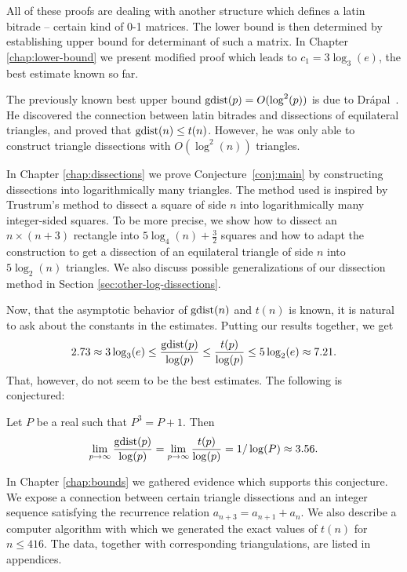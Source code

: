 All of these proofs are dealing with another structure which defines a latin bitrade -- certain kind of 0-1 matrices. The lower bound is then determined by establishing upper bound for determinant of such a matrix. In Chapter \ref{chap:lower-bound} we present modified proof which leads to $c_1 = 3 \log_3(e)$, the best estimate known so far.

\bigskip

The previously known best upper bound $\mathop{\mathrm{gdist}}(p) = O(\log^2(p))$ is due to Drápal~\cite{Drapal91}. He discovered the connection between latin bitrades and dissections of equilateral triangles, and proved that $\mathop{\mathrm{gdist}}(n) \leq t(n)$. However, he was only able to construct triangle dissections with $O(\log^2(n))$ triangles.

In Chapter \ref{chap:dissections} we prove Conjecture~\ref{conj:main} by constructing dissections into logarithmically many triangles. The method used is inspired by Trustrum's method \cite{Trustrum65} to  dissect a square of side $n$ into logarithmically many integer-sided squares. To be more precise, we show how to dissect an $n \times (n+3)$ rectangle into $5 \log_4(n) + \frac{3}{2}$ squares and how to adapt the construction to get a dissection of an equilateral triangle of side $n$ into $5 \log_2(n)$ triangles. We also discuss possible generalizations of our dissection method in Section \ref{sec:other-log-dissections}.

\bigskip

Now, that the asymptotic behavior of $\mathop{\mathrm{gdist}}(n)$ and $t(n)$ is known, it is natural to ask about the constants in the estimates. Putting our results together, we get
\begin{eqnarray}
	2.73 \approx 3 \log_3(e) \leq \frac{\mathop{\mathrm{gdist}}(p)}{\log(p)} \leq \frac{t(p)}{\log(p)} \leq 5 \log_2(e) \approx 7.21.
\end{eqnarray}
That, however, do not seem to be the best estimates. The following is conjectured:

\begin{conj-intro}
Let $P$ be a real such that $P^3 = P+1$. Then
\begin{eqnarray}
	\lim_{p \rightarrow \infty} \frac{\mathop{\mathrm{gdist}}(p)}{\log(p)} =
	\lim_{p \rightarrow \infty} \frac{t(p)}{\log(p)} = 1/\log(P) \approx 3.56.
\end{eqnarray}
\end{conj-intro}

In Chapter \ref{chap:bounds} we gathered evidence which supports this conjecture. We expose a connection between certain triangle dissections and an integer sequence satisfying the recurrence relation $a_{n+3} = a_{n+1} + a_n$. We also describe a computer algorithm with which we generated the exact values of $t(n)$ for $n \leq 416$. The data, together with corresponding triangulations, are listed in appendices.






